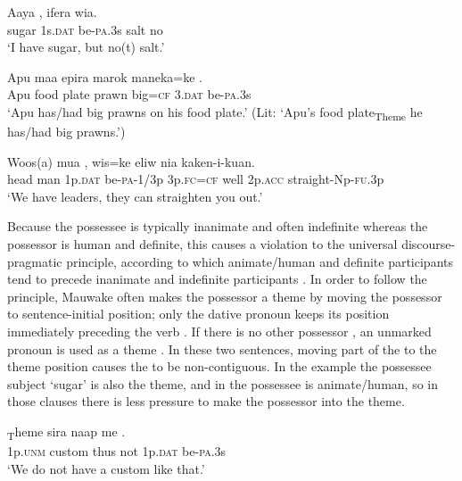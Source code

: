 \ea%
\label{ex:5:x595}
\gll Aaya    ,  ifera  wia. \\
     sugar  1s.\textsc{dat}  be-\textsc{pa}.3s  salt  no \\
\glt `I have sugar, but no(t) salt.'
\z

\ea%
\label{ex:5:x1065}
\gll Apu  maa  epira  marok  maneka=ke   . \\
     Apu  food  plate  prawn  big=\textsc{cf}  3.\textsc{dat}  be-\textsc{pa}.3s \\
\glt `Apu has/had big prawns on his food plate.' (Lit: `Apu's food plate\textsubscript{Theme} he has/had big prawns.')
\z

\ea%
\label{ex:5:x1323}
\gll Woos(a)  mua   ,  wis=ke  eliw  nia kaken-i-kuan. \\
     head  man  1p.\textsc{dat}  be-\textsc{pa}-1/3p  3p.\textsc{fc}=\textsc{cf}  well  2p.\textsc{acc} straight-Np-\textsc{fu}.3p \\
\glt `We have leaders, they can straighten you out.'
\z

Because the possessee is typically inanimate and often indefinite whereas the possessor is human and definite, this causes a violation to the universal discourse-pragmatic principle, according to which animate/human and definite participants tend to precede inanimate and indefinite participants \citep[135]{Heine1997}. In order to follow the principle, Mauwake often makes the possessor a theme by moving the possessor  to sentence-initial position; only the dative pronoun keeps its position immediately preceding the verb . If there is no other possessor , an unmarked pronoun is used as a theme . In these two sentences, moving part of the  to the theme position causes the  to be non-contiguous. In the example  the possessee subject  `sugar' is also the theme, and in  the possessee is animate/human, so in those clauses there is less pressure to make the possessor into the theme.

\ea%
\label{ex:5:x973}
\gll [\textstyleEmphasizedVernacularWords{I}]\textsubscript{T}heme  sira  naap  me   . \\
     1p.\textsc{unm}  custom  thus  not  1p.\textsc{dat}  be-\textsc{pa}.3s \\
\glt `We do not have a custom like that.'
\z

